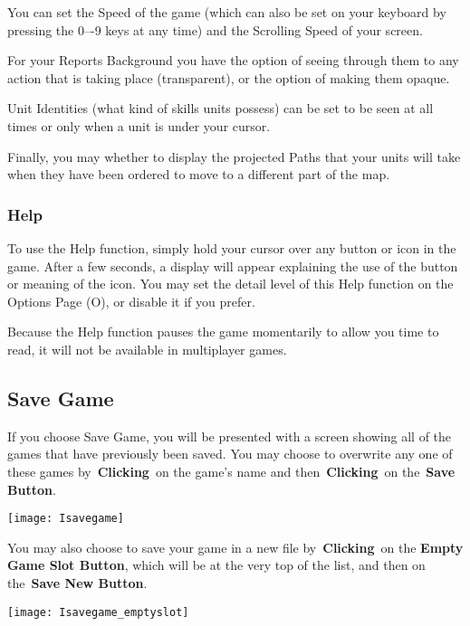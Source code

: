 You can set the Speed of the game (which can also be set on your keyboard by pressing the 0–-9 keys at any time) and the Scrolling Speed of your screen.

For your Reports Background you have the option of seeing through them to any action that is taking place (transparent), or the option of making them opaque.

Unit Identities (what kind of skills units possess) can be set to be seen at all times or only when a unit is under your cursor.

Finally, you may whether to display the projected Paths that your units will take when they have been ordered to move to a different part of the map.

\subsubsection{Help}

To use the Help function, simply hold your cursor over any button or icon in the game. After a few seconds, a display will appear explaining the use of the button or meaning of the icon. You may set the detail level of this Help function on the Options Page (O), or disable it if you prefer.

Because the Help function pauses the game momentarily to allow you time to read, it will not be available in multiplayer games.

\subsection{Save Game}


If you choose Save Game, you will be presented with a screen showing all of the games that have previously been saved. You may choose to overwrite any one of these games by \textbf{Clicking} on the game’s name and then \textbf{Clicking} on the \textbf{Save Button}.

\begin{center}
	\texttt{[image: Isavegame]}
\end{center}

You may also choose to save your game in a new file by \textbf{Clicking} on the \textbf{Empty Game Slot Button}, which will be at the very top of the list, and then on the \textbf{Save New Button}.

\begin{center}
	\texttt{[image: Isavegame\_emptyslot]}
\end{center}

